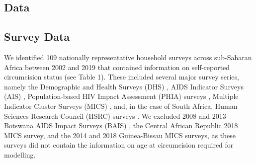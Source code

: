 \documentclass{article}
\begin{document}
\begin{appendix}


\newpage

\tableofcontents

\newpage


\section{Data}
\label{sec:org8802288}


\subsection{Survey Data}
\label{sec:org09db5e8}


We identified 109 nationally representative household surveys across sub-Saharan Africa between 2002 and 2019 that contained information on self-reported circumcision status (see Table 1). These included several major survey series, namely the Demographic and Health Surveys (DHS) \cite{dhs}, AIDS Indicator Surveys (AIS) \cite{ais}, Population-based HIV Impact Assessment (PHIA) surveys \cite{phia}, Multiple Indicator Cluster Surveys (MICS) \cite{mics}, and, in the case of South Africa, Human Sciences Research Council (HSRC) surveys \cite{hsrc2002, hsrc2008, hsrc2012, hsrc2017}. {\color{red}We excluded 2008 and 2013 Botswana AIDS Impact Surveys (BAIS) \cite{bais2008, bais2013}, the Central African Republic 2018 MICS survey, and the 2014 and 2018 Guinea-Bissau MICS surveys, as these surveys did not contain the information on age at circumcision required for modelling.}


\end{appendix}
\end{document}
